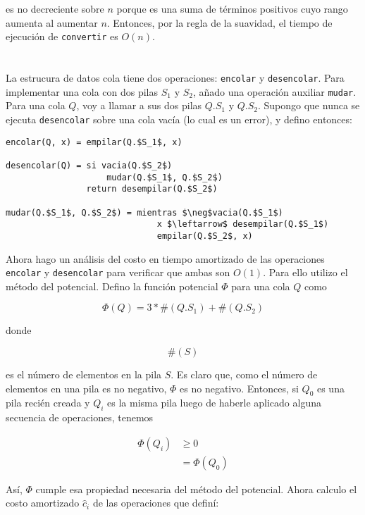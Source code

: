 \documentclass{article}
\begin{document}
es no decreciente sobre $n$ porque es una suma de términos positivos cuyo
rango aumenta al aumentar $n$. Entonces, por la regla de la suavidad, el tiempo
de ejecución de \texttt{convertir} es $O(n)$.

\section{}

La estrucura de datos cola tiene dos operaciones: \texttt{encolar} y
\texttt{desencolar}. Para implementar una cola con dos pilas $S_1$ y $S_2$,
añado una operación auxiliar \texttt{mudar}. Para una cola $Q$, voy a llamar a
sus dos pilas $Q.S_1$ y $Q.S_2$. Supongo que nunca se ejecuta
\texttt{desencolar} sobre una cola vacía (lo cual es un error), y defino
entonces:

\begin{lstlisting}
encolar(Q, x) = empilar(Q.$S_1$, x)

desencolar(Q) = si vacia(Q.$S_2$)
                    mudar(Q.$S_1$, Q.$S_2$)
                return desempilar(Q.$S_2$)

mudar(Q.$S_1$, Q.$S_2$) = mientras $\neg$vacia(Q.$S_1$)
                              x $\leftarrow$ desempilar(Q.$S_1$)
                              empilar(Q.$S_2$, x)
\end{lstlisting}

Ahora hago un análisis del costo en tiempo amortizado de las operaciones
\texttt{encolar} y \texttt{desencolar} para verificar que ambas son $O(1)$. Para
ello utilizo el método del potencial. Defino la función potencial $\Phi$ para
una cola $Q$ como 

\[\Phi(Q) = 3 * \#(Q.S_1) + \#(Q.S_2)\]

donde

\[\#(S)\]

es el número de elementos en la pila $S$. Es claro que, como el número de
elementos en una pila es no negativo, $\Phi$ es no negativo. Entonces, si $Q_0$
es una pila recién creada y $Q_i$ es la misma pila luego de haberle aplicado
alguna secuencia de operaciones, tenemos

\begin{align*}
\Phi(Q_i) &\geq 0 \\
          &= \Phi(Q_0)
\end{align*}

Así, $\Phi$ cumple esa propiedad necesaria del método del potencial. Ahora
calculo el costo amortizado $\hat{c}_i$ de las operaciones que definí:
\end{document}
